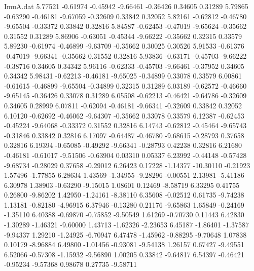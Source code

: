 \begin{filecontents}{ImuA.dat}
   5.77521   -0.61974   -0.45942   -9.66461   -0.36426    0.34605    0.31289
   5.79865   -0.63290   -0.46181   -9.67059   -0.32609    0.33842    0.32052
   5.82161   -0.62812   -0.46780   -9.65504   -0.33372    0.33842    0.32816
   5.84587   -0.62453   -0.47019   -9.65624   -0.35662    0.31552    0.31289
   5.86906   -0.63051   -0.45344   -9.66222   -0.35662    0.32315    0.33579
   5.89230   -0.61974   -0.46899   -9.63709   -0.35662    0.30025    0.30526
   5.91533   -0.61376   -0.47019   -9.66341   -0.35662    0.31552    0.32816
   5.93836   -0.63171   -0.45703   -9.66222   -0.38716    0.34605    0.34342
   5.96116   -0.62333   -0.45703   -9.66461   -0.37952    0.34605    0.34342
   5.98431   -0.62213   -0.46181   -9.65025   -0.34899    0.33078    0.33579
   6.00861   -0.61615   -0.46899   -9.65504   -0.34899    0.32315    0.31289
   6.03189   -0.62572   -0.46660   -9.65145   -0.36426    0.33078    0.31289
   6.05508   -0.62213   -0.46421   -9.64786   -0.32609    0.34605    0.28999
   6.07811   -0.62094   -0.46181   -9.66341   -0.32609    0.33842    0.32052
   6.10120   -0.62692   -0.46062   -9.64307   -0.35662    0.33078    0.33579
   6.12387   -0.62453   -0.45224   -9.64068   -0.33372    0.31552    0.32816
   6.14743   -0.62812   -0.45464   -9.65743   -0.31846    0.33842    0.32816
   6.17097   -0.64487   -0.46780   -9.68615   -0.28793    0.37658    0.32816
   6.19394   -0.65085   -0.49292   -9.66341   -0.28793    0.42238    0.32816
   6.21680   -0.46181   -0.61017   -9.51506   -0.63904    0.03310    0.05337
   6.23992   -0.44148   -0.57428   -9.68734   -0.28029    0.37658   -0.29012
   6.26423    0.17228   -1.14377  -10.30110   -0.21923    1.57496   -1.77855
   6.28634    1.43569   -1.34955   -9.28296   -0.00551    2.13981   -5.41186
   6.30978    1.38903   -0.63290   -9.15015    1.08601    0.12469   -8.58719
   6.33295    0.41755    0.26800   -9.86202    1.42950   -1.24161   -8.38110
   6.35608   -0.02512    0.61735   -9.74238    1.13181   -0.82180   -4.96915
   6.37946   -0.13280    0.21176   -9.65863    1.65849   -0.24169   -1.35110
   6.40388   -0.69870   -0.75852   -9.50549    1.61269   -0.70730    0.11443
   6.42830   -1.30289   -1.46321   -9.60000    1.43713   -1.62326   -2.23653
   6.45187   -1.86401   -1.37587   -9.94337    1.29210   -1.24925   -6.70947
   6.47478   -1.45962   -0.88295   -9.70648    1.07838    0.10179   -8.96884
   6.49800   -1.01456   -0.93081   -9.54138    1.26157    0.67427   -9.49551
   6.52066   -0.57308   -1.15932   -9.56890    1.00205    0.33842   -9.64817
   6.54397   -0.46421   -0.95234   -9.57368    0.98678    0.27735   -9.58711

\end{filecontents}

